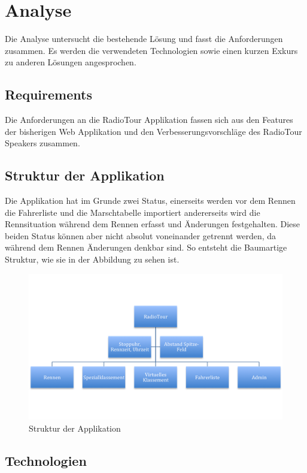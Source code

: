 \chapter{Analyse}

Die Analyse untersucht die bestehende Lösung und fasst die Anforderungen zusammen. Es werden die verwendeten Technologien sowie einen kurzen Exkurs zu anderen Lösungen angesprochen.

\section{Requirements}
Die Anforderungen an die RadioTour Applikation fassen sich aus den Features der bisherigen Web Applikation und den Verbesserungsvorschläge des RadioTour Speakers zusammen.


\section{Struktur der Applikation}
Die Applikation hat im Grunde zwei Status, einerseits werden vor dem Rennen die Fahrerliste und die Marschtabelle importiert andererseits wird die Rennsituation während dem Rennen erfasst und Änderungen festgehalten. Diese beiden Status können aber nicht absolut voneinander getrennt werden, da während dem Rennen Änderungen denkbar sind. So entsteht die Baumartige Struktur, wie sie in der Abbildung zu sehen ist.

\begin{figure}[h!]
\caption{Struktur der Applikation}
\centering
\includegraphics{05technischerbericht/images/struktur.png}
\end{figure} 



\section{Technologien}
